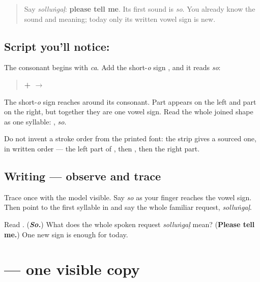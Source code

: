 \label{lesson:TA-W08-short-o-observe}



\begin{quote}
Say \emph{solluṅgaḷ}: \textbf{please tell me}. Its first sound is \emph{so}. You already know the sound and meaning; today only its written vowel sign is new.
\end{quote}

\subsection*{Script you'll notice: }
The consonant \textbf{} begins with \emph{ca}. Add the short-\emph{o} sign \textbf{}, and it reads \emph{so}:

\begin{quote}
\textbf{ +  $\to$ }
\end{quote}

The short-\emph{o} sign reaches around its consonant. Part appears on the left and part on the right, but together they are one vowel sign. Read the whole joined shape as one syllable: \textbf{}, \emph{so}.

Do not invent a stroke order from the printed font: the strip gives a sourced one, in written order — the left part of \textbf{}, then \textbf{}, then the right part.

\subsection*{Writing — observe and trace}

Trace \textbf{} once with the model visible. Say \emph{so} as your finger reaches the vowel sign. Then point to the first syllable in \textbf{} and say the whole familiar request, \emph{solluṅgaḷ}.

\begin{tcolorbox}[breakable,colback=teal!4,colframe=teal!35!black,title={Before you move on}]
Read \textbf{}. (\emph{\textbf{So.}}) What does the whole spoken request \emph{solluṅgaḷ} mean? (\textbf{Please tell me.}) One new sign is enough for today.
\end{tcolorbox}
\section[\texorpdfstring{\ta{சொல்லுங்கள்} (solluṅgaḷ)}{சொல்லுங்கள் (solluṅgaḷ)}]{ — one visible copy}

